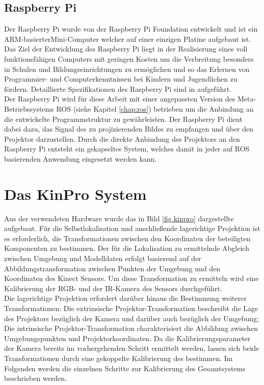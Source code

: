 \subsection{Raspberry Pi}
Der Raspberry Pi wurde von der Raspberry Pi Foundation  entwickelt und ist ein ARM-basierter\red[fußnote?] Mini-Computer welcher auf einer einzigen Platine aufgebaut ist. Das Ziel der Entwicklung des Raspberry Pi liegt in der Realisierung eines voll funktionsfähigen Computers mit geringen Kosten um die Verbreitung besonders in Schulen und Bildungseinrichtungen zu ermöglichen und so das Erlernen von Programmier- und Computerkenntnissen bei Kindern und Jugendlichen zu fördern. Detaillierte Spezifikationen des Raspberry Pi sind in  aufgeführt.\\
Der Raspberry Pi wird für diese Arbeit mit einer angepassten Version des Meta-Betriebssystems ROS (siehe Kapitel \ref{chap:ros}) betrieben um die Anbindung an die entwickelte Programmstruktur zu gewährleisten. Der Raspberry Pi dient dabei dazu, das Signal des zu projizierenden Bildes zu empfangen und über den Projektor darzustellen. Durch die direkte Anbindung des Projektors an den Raspberry Pi entsteht ein gekapseltes System, welches damit in jeder auf ROS basierenden Anwendung eingesetzt werden kann.

\section{Das KinPro System}
Aus der verwendeten Hardware wurde das in Bild \ref{fig.kinpro} dargestellte \kps aufgebaut. Für die Selbstlokalisation und anschließende lagerichtige Projektion ist es erforderlich, die Transformationen zwischen den Koordinaten der beteiligten Komponenten zu bestimmen. Der für die Lokalisation zu ermittelnde Abgleich zwischen Umgebung und Modelldaten erfolgt basierend auf der Abbildungstransformation zwischen Punkten der Umgebung und den Koordinaten des Kinect Sensors. Um diese Transformation zu ermitteln wird eine Kalibrierung der RGB- und der IR-Kamera des Sensors durchgeführt.\\
Die lagerichtige Projektion erfordert darüber hinaus die Bestimmung weiterer Transformationen: Die extrinsische Projektor-Transformation beschreibt die Lage des Projektors bezüglich der Kamera und darüber auch bezüglich der Umgebung; Die intrinsische Projektor-Transformation charakterisiert die Abbildung zwischen Umgebungspunkten und Projektorkoordinaten. Da die Kalibrierungsparameter der Kamera bereits im vorhergehenden Schritt ermittelt werden, lassen sich beide Transformationen durch eine gekoppelte Kalibrierung des  bestimmen. Im Folgenden werden die einzelnen Schritte zur Kalibrierung des Gesamtsystems beschrieben werden.

